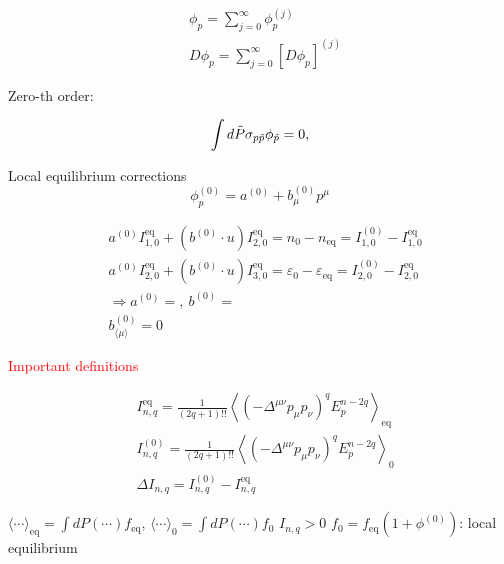 \documentclass[aps,prd,preprint,nofootinbib,amsmath,amssymb,showpacs,longbibliography,singlecolumn,superscriptaddress,10pt]{revtex4-1}
\theoremstyle{plain}
\theoremstyle{definition}
\begin{document}
\begin{equation}
\begin{aligned}
&
\phi_{p} = \sum_{j=0}^{\infty} \phi_{p}^{(j)} \\
&
D\phi_{p} = \sum_{j=0}^{\infty} [D\phi_{p}]^{(j)} 
\end{aligned}    
\end{equation}



Zero-th order:

\begin{equation}
\int d \Tilde{P} \sigma_{p \Tilde{p}} \phi_{\Tilde{p}} = 0 ,
\end{equation}

Local equilibrium corrections
\begin{equation}
\phi_{p}^{(0)} = a^{(0)} + b_{\mu}^{(0)} p^{\mu}   
\end{equation}

\begin{equation}
\begin{aligned}
&
a^{(0)} I_{1,0}^{\mathrm{eq}} + (b^{(0)} \cdot u) I_{2,0}^{\mathrm{eq}} = n_{0} - n_{\mathrm{eq}} = I_{1,0}^{(0)} - I_{1,0}^{\mathrm{eq}}
\\
&
a^{(0)} I_{2,0}^{\mathrm{eq}} + (b^{(0)} \cdot u) I_{3,0}^{\mathrm{eq}} = \varepsilon_{0} - \varepsilon_{\mathrm{eq}} = I_{2,0}^{(0)} - I_{2,0}^{\mathrm{eq}}
\\
&
\Rightarrow a^{(0)} = , \  b^{(0)} = 
\\
&
b^{(0)}_{\langle \mu \rangle} = 0
\end{aligned}    
\end{equation}


\textcolor{red}{Important definitions}


\begin{equation}
\begin{aligned}
&
I_{n,q}^{\mathrm{eq}} = \frac{1}{(2q+1)!!} \left\langle \left( -\Delta^{\mu \nu} p_{\mu} p_{\nu} \right)^{q} E_{p}^{n-2q}  \right\rangle_{\mathrm{eq}} 
\\
&
I_{n,q}^{(0)} = \frac{1}{(2q+1)!!} \left\langle \left( -\Delta^{\mu \nu} p_{\mu} p_{\nu} \right)^{q} E_{p}^{n-2q}  \right\rangle_{0}
\\
&
\Delta I_{n,q} = I_{n,q}^{(0)} - I_{n,q}^{\mathrm{eq}}
\end{aligned}    
\end{equation}


$\langle \cdots \rangle_{\mathrm{eq}} = \int dP (\cdots)  f_{\mathrm{eq}}$, $\langle \cdots \rangle_{0} = \int dP (\cdots)  f_{0}$ $I_{n,q} > 0$ $f_{0} = f_{\mathrm{eq}} (1 +\phi^{(0)})$: local equilibrium
\end{document}
